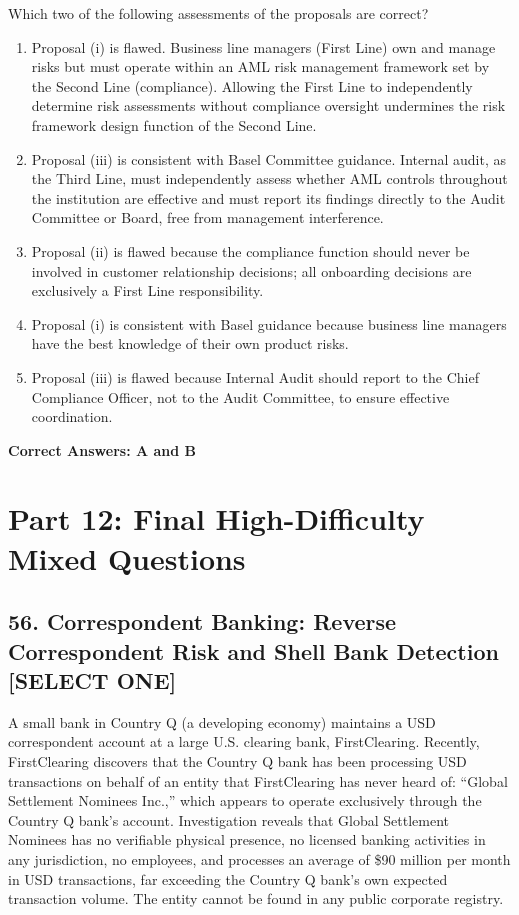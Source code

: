 \documentclass[11pt,a4paper]{article}
\begin{document}
	Which two of the following assessments of the proposals are correct?
	
	\begin{enumerate}[label=\Alph*.]
		\item Proposal (i) is flawed. Business line managers (First Line) own and manage risks but must operate within an AML risk management framework set by the Second Line (compliance). Allowing the First Line to independently determine risk assessments without compliance oversight undermines the risk framework design function of the Second Line.
		\item Proposal (iii) is consistent with Basel Committee guidance. Internal audit, as the Third Line, must independently assess whether AML controls throughout the institution are effective and must report its findings directly to the Audit Committee or Board, free from management interference.
		\item Proposal (ii) is flawed because the compliance function should never be involved in customer relationship decisions; all onboarding decisions are exclusively a First Line responsibility.
		\item Proposal (i) is consistent with Basel guidance because business line managers have the best knowledge of their own product risks.
		\item Proposal (iii) is flawed because Internal Audit should report to the Chief Compliance Officer, not to the Audit Committee, to ensure effective coordination.
	\end{enumerate}
	\textbf{Correct Answers: A and B}
	
	\section{Part 12: Final High-Difficulty Mixed Questions}
	
	\subsection{56. Correspondent Banking: Reverse Correspondent Risk and Shell Bank Detection \textnormal{[SELECT ONE]}}
	
	A small bank in Country Q (a developing economy) maintains a USD correspondent account at a large U.S. clearing bank, FirstClearing. Recently, FirstClearing discovers that the Country Q bank has been processing USD transactions on behalf of an entity that FirstClearing has never heard of: ``Global Settlement Nominees Inc.,'' which appears to operate exclusively through the Country Q bank's account. Investigation reveals that Global Settlement Nominees has no verifiable physical presence, no licensed banking activities in any jurisdiction, no employees, and processes an average of \$90 million per month in USD transactions, far exceeding the Country Q bank's own expected transaction volume. The entity cannot be found in any public corporate registry.
	
\end{document}
